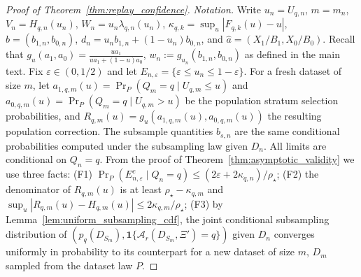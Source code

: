 \documentclass[10pt]{article}
\begin{document}
\begin{proof}[Proof of Theorem~\ref{thm:replay_confidence}]
\emph{Notation.} Write $u_n=U_{q,n}$, $m=m_n$, $V_n=H_{q,n}(u_n)$, $W_n=u_n\lambda_{q,n}(u_n)$, $\kappa_{q,k}=\sup_u|F_{q,k}(u)-u|$, $b=(b_{1,n},b_{0,n})$, $d_n=u_nb_{1,n}+(1-u_n)b_{0,n}$, and $\widehat a=(X_1/B_1,X_0/B_0)$. Recall that $g_u\left(a_1, a_0\right)=\frac{u a_1}{u a_1+(1-u) a_0}$, $w_n:=g_{u_n}\left(b_{1, n}, b_{0, n}\right)$ as defined in the main text. Fix $\varepsilon\in(0,1/2)$ and let $E_{n,\varepsilon}=\{\varepsilon\le u_n\le1-\varepsilon\}$. For a fresh dataset of size $m$, let $a_{1,q,m}(u)=\Pr_P(Q_m=q\mid U_{q,m}\le u)$ and $a_{0,q,m}(u)=\Pr_P(Q_m=q\mid U_{q,m}>u)$ be the population stratum selection probabilities, and $R_{q,m}(u)=g_u(a_{1,q,m}(u),a_{0,q,m}(u))$ the resulting population correction. The subsample quantities $b_{s,n}$ are the same conditional probabilities computed under the subsampling law given $D_n$. All limits are conditional on $Q_n=q$. From the proof of Theorem~\ref{thm:asymptotic_validity} we use three facts: (F1) $\Pr_P(E_{n,\varepsilon}^c\mid Q_n=q)\le(2\varepsilon+2\kappa_{q,n})/\rho_\star$; (F2) the denominator of $R_{q,m}(u)$ is at least $\rho_\star-\kappa_{q,m}$ and $\sup_u|R_{q,m}(u)-H_{q,m}(u)|\le2\kappa_{q,m}/\rho_\star$; (F3) by Lemma~\ref{lem:uniform_subsampling_cdf}, the joint conditional subsampling distribution of $(p_q(D_{S_m}),\mathbf 1\{\mathcal A_r(D_{S_m},\Xi')=q\})$ given $D_n$ converges uniformly in probability to its counterpart for a new dataset of size $m$, $D_m$ sampled from the dataset law $P$.


\end{proof}
\end{document}
